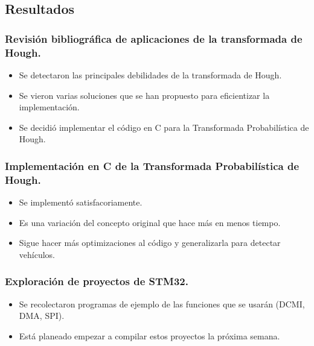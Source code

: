 
\subsection{Resultados}


\subsubsection[Revisión bibliográfica transformada de Hough.]{Revisión bibliográfica de aplicaciones de la transformada de Hough.}
\begin{itemize}
	\item Se detectaron las principales debilidades de la transformada de Hough.
	\item Se vieron varias soluciones que se han propuesto para eficientizar la implementación.
	\item Se decidió implementar el código en C para la Transformada Probabilística de Hough.
\end{itemize}


\subsubsection[Código C de la T. Probabilística de Hough]{Implementación en C de la Transformada Probabilística de Hough.}
\begin{itemize}
	\item Se implementó satisfacoriamente.
	\item Es una variación del concepto original que hace más en menos tiempo.
	\item Sigue hacer más optimizaciones al código y generalizarla para detectar vehículos.
\end{itemize}


\subsubsection{Exploración de proyectos de STM32.}
\begin{itemize}
	\item Se recolectaron programas de ejemplo de las funciones que se usarán (DCMI, DMA, SPI).
	\item Está planeado empezar a compilar estos proyectos la próxima semana.
\end{itemize}

